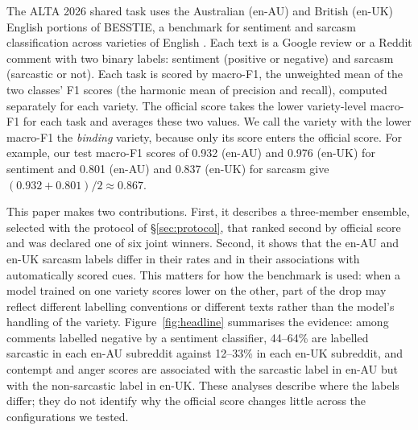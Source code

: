 \documentclass[11pt]{article}
\begin{document}
The ALTA 2026 shared task \citep{alta2026task} uses the Australian (en-AU) and British (en-UK) English portions of
BESSTIE, a benchmark for sentiment and sarcasm classification across varieties of English
\citep{srirag-etal-2025-besstie}. Each text is a Google review or a Reddit comment with two binary labels: sentiment
(positive or negative) and sarcasm (sarcastic or not). Each task is scored by macro-F1, the unweighted mean of the two
classes' F1 scores (the harmonic mean of precision and recall), computed separately for each variety. The official score takes the lower variety-level macro-F1 for
each task and averages these two values. We call the variety with the lower macro-F1 the \emph{binding} variety, because
only its score enters the official score. For example, our test macro-F1 scores of 0.932 (en-AU) and 0.976 (en-UK) for
sentiment and 0.801 (en-AU) and 0.837 (en-UK) for sarcasm give $(0.932+0.801)/2\approx0.867$.

This paper makes two contributions. First, it describes a three-member ensemble, selected with the protocol of
\S\ref{sec:protocol}, that ranked second by official score and was declared one of six joint winners. Second, it shows that the en-AU and en-UK sarcasm labels
differ in their rates and in their associations with automatically scored cues. This matters for how the benchmark is
used: when a model trained on one variety scores lower on the other, part of the drop may reflect different labelling
conventions or different texts rather than the model's handling of the variety. Figure~\ref{fig:headline} summarises the
evidence: among comments labelled negative by a sentiment classifier, 44--64\% are labelled sarcastic in each en-AU
subreddit against 12--33\% in each en-UK subreddit, and contempt and anger scores are associated with the sarcastic label
in en-AU but with the non-sarcastic label in en-UK. These analyses describe where the labels differ; they do not identify
why the official score changes little across the configurations we tested.
\end{document}
